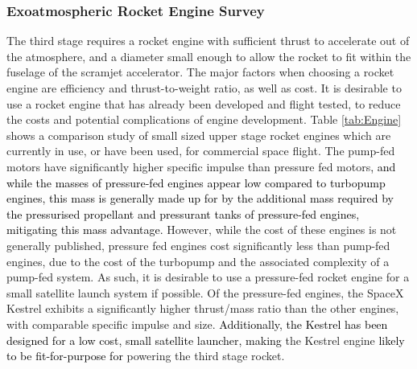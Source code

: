		\subsubsection{Exoatmospheric Rocket Engine Survey}
		The third stage requires a rocket engine with sufficient thrust to accelerate out of the atmosphere, and a diameter small enough to allow the rocket to fit within the fuselage of the scramjet accelerator. The major factors when choosing a rocket engine are efficiency and thrust-to-weight ratio, as well as cost. It is desirable to use a rocket engine that has already been developed and flight tested, to reduce the costs and potential complications of engine development. Table \ref{tab:Engine} shows a comparison study of small sized upper stage rocket engines which are currently in use, or have been used, for commercial space flight. The pump-fed motors have significantly higher specific impulse than pressure fed motors\textcolor{black}{, and while the masses of pressure-fed engines appear low compared to turbopump engines, this mass is generally made up for by the additional mass required by the pressurised propellant and pressurant tanks of pressure-fed engines, mitigating this mass advantage.} However, while the cost of these engines is not generally published, pressure fed engines cost significantly less than pump-fed engines, due to the cost of the turbopump and the associated complexity of a pump-fed system.  As such, it is desirable to use a pressure-fed rocket engine for a small satellite launch system if possible. Of the pressure-fed engines, the SpaceX Kestrel exhibits a significantly higher thrust/mass ratio than the other engines, with comparable specific impulse and size. \textcolor{black}{Additionally, the Kestrel has been designed for a low cost, small satellite launcher, making} the Kestrel engine \textcolor{black}{likely to be fit-for-purpose for} powering the third stage rocket.  
